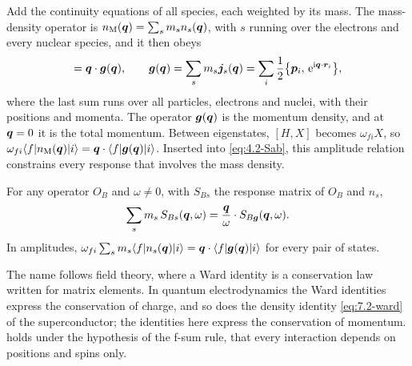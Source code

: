 Add the continuity equations of all species, each weighted by its mass. The mass-density operator is $n_{\mathrm{M}}(\bm{q}) = \sum_sm_sn_s(\bm{q})$, with $s$ running over the electrons and every nuclear species, and it then obeys
\begin{equation}
  [H, n_{\mathrm{M}}(\vect{q})] = \vect{q}\cdot\vect{g}(\vect{q}) , \qquad
  \vect{g}(\vect{q}) = \sum_sm_s\vect{j}_s(\vect{q}) = \sum_i\frac12\bigl\{\vect{p}_i,\,\ee^{\ii\vect{q}\cdot\vect{r}_i}\bigr\} ,
  \label{eq:8.3-mass}
\end{equation}
where the last sum runs over all particles, electrons and nuclei, with their positions and momenta. The operator $\bm{g}(\bm{q})$ is the momentum density, and at $\bm{q} = 0$ it is the total momentum. Between eigenstates, $[H, X]$ becomes $\omega_{fi}X$, so $\omega_{fi}\langle f|n_{\mathrm{M}}(\bm{q})|i\rangle = \bm{q}\cdot\langle f|\bm{g}(\bm{q})|i\rangle$. Inserted into \cref{eq:4.2-Sab}, this amplitude relation constrains every response that involves the mass density.
\begin{keyresult}
For any operator $O_B$ and $\omega \neq 0$, with $S_{Bs}$ the response matrix of $O_B$ and $n_s$,
\begin{equation}
  \sum_sm_s\,S_{Bs}(\bm{q},\omega) = \frac{\bm{q}}{\omega}\cdot S_{B\bm{g}}(\bm{q},\omega) .
  \label{eq:8.3-ward}
\end{equation}
In amplitudes, $\omega_{fi}\sum_sm_s\langle f|n_s(\bm{q})|i\rangle = \bm{q}\cdot\langle f|\bm{g}(\bm{q})|i\rangle$ for every pair of states.
\end{keyresult}
\noindent The name follows field theory, where a Ward identity is a conservation law written for matrix elements. In quantum electrodynamics the Ward identities express the conservation of charge, and so does the density identity \cref{eq:7.2-ward} of the superconductor; the identities here express the conservation of momentum.  holds under the hypothesis of the f-sum rule, that every interaction depends on positions and spins only.

